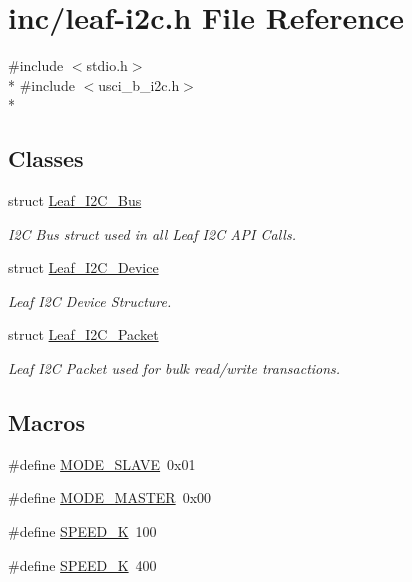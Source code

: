 \hypertarget{leaf-i2c_8h}{\section{inc/leaf-\/i2c.h File Reference}
\label{leaf-i2c_8h}
}
{\ttfamily \#include $<$stdio.\-h$>$}\\*
{\ttfamily \#include $<$usci\-\_\-b\-\_\-i2c.\-h$>$}\\*
\subsection*{Classes}
\begin{DoxyCompactItemize}
\item 
struct \hyperlink{structLeaf__I2C__Bus}{Leaf\-\_\-\-I2\-C\-\_\-\-Bus}
\begin{DoxyCompactList}\small\item\em I2\-C Bus struct used in all Leaf I2\-C A\-P\-I Calls. \end{DoxyCompactList}\item 
struct \hyperlink{structLeaf__I2C__Device}{Leaf\-\_\-\-I2\-C\-\_\-\-Device}
\begin{DoxyCompactList}\small\item\em Leaf I2\-C Device Structure. \end{DoxyCompactList}\item 
struct \hyperlink{structLeaf__I2C__Packet}{Leaf\-\_\-\-I2\-C\-\_\-\-Packet}
\begin{DoxyCompactList}\small\item\em Leaf I2\-C Packet used for bulk read/write transactions. \end{DoxyCompactList}\end{DoxyCompactItemize}
\subsection*{Macros}
\begin{DoxyCompactItemize}
\item 
\#define \hyperlink{leaf-i2c_8h_a9d7dd898c49effbf2c7413ead1441da3}{M\-O\-D\-E\-\_\-\-S\-L\-A\-V\-E}~0x01
\item 
\#define \hyperlink{leaf-i2c_8h_ab1f052100aebfd430d89e542dbfd3586}{M\-O\-D\-E\-\_\-\-M\-A\-S\-T\-E\-R}~0x00
\item 
\#define \hyperlink{leaf-i2c_8h_aeb86079282d3c93957ac59aab3d17e74}{S\-P\-E\-E\-D\-\_\-K}~100
\item 
\#define \hyperlink{leaf-i2c_8h_a1c927393f9874ddbd32f09ec0068e664}{S\-P\-E\-E\-D\-\_\-K}~400
\end{DoxyCompactItemize}
